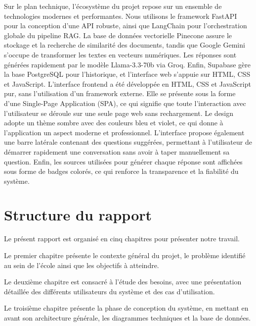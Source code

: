 \documentclass[12pt,a4paper]{report}
\begin{document}
Sur le plan technique, l'écosystème du projet repose sur un ensemble de \newline technologies modernes et performantes. Nous utilisons le framework FastAPI pour la conception d'une API robuste, ainsi que LangChain pour l'orchestration globale du \newline  pipeline RAG. \newpage La base de données vectorielle Pinecone assure le stockage et la recherche de similarité des documents, tandis que Google Gemini s'occupe de transformer les textes en vecteurs numériques. Les réponses sont générées rapidement par le modèle Llama-3.3-70b via Groq. Enfin, Supabase gère la base PostgreSQL pour l'historique, et l'interface web s'appuie sur HTML, CSS et JavaScript.
L'interface frontend a été développée en HTML, CSS et JavaScript pur, sans l'utilisation d'un framework externe. Elle se présente sous la forme d'une Single-Page Application (SPA), ce qui signifie que toute l'interaction avec \newline l'utilisateur se déroule sur une seule page web sans rechargement. Le design adopte un thème sombre avec des couleurs bleu et violet, ce qui donne à l'application un aspect moderne et professionnel. L'interface propose également une barre latérale contenant des questions suggérées, permettant à l'utilisateur de démarrer rapidement une conversation sans avoir à taper manuellement sa question. Enfin, les sources utilisées pour générer chaque réponse sont affichées sous forme de badges colorés, ce qui renforce la transparence et la fiabilité du système.

\section{Structure du rapport}

Le présent rapport est organisé en cinq chapitres pour présenter notre travail.

Le premier chapitre présente le contexte général du projet, le problème identifié au sein de l’école ainsi que les objectifs à atteindre.
\newline

Le deuxième chapitre est consacré à l’étude des besoins, avec une présentation détaillée des différents utilisateurs du système et des cas d’utilisation.
\newline

Le troisième chapitre présente la phase de conception du système, en mettant en avant son architecture générale, les diagrammes techniques et la base de données.
\newline
\end{document}
